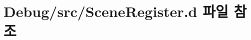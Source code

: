 \hypertarget{_scene_register_8d}{\section{Debug/src/\+Scene\+Register.d 파일 참조}
\label{_scene_register_8d}
}
